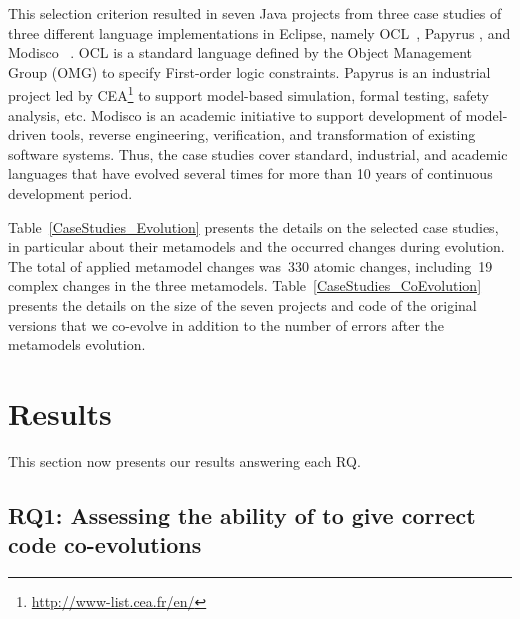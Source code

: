 
This selection criterion resulted in seven Java projects from three case studies of three different language implementations in Eclipse, namely OCL~\cite{MDTOCL}, Papyrus \cite{MDTPapyrus}, and Modisco~\cite{MDTModisco} .
%
OCL is a standard language defined by the Object Management Group (OMG) to specify First-order logic constraints. Papyrus is an industrial project led by CEA\footnote{\url{http://www-list.cea.fr/en/}} to support model-based simulation, formal testing, safety analysis, etc. Modisco is an academic initiative to support development of model-driven tools, reverse engineering, verification, and transformation of existing software systems. 
Thus, the case studies cover standard, industrial, and academic languages that have evolved several times for more than 10 years of continuous development period.

Table~\ref{CaseStudies_Evolution} presents the details on the selected case studies, in particular about their metamodels and the occurred changes during evolution. The total of applied metamodel changes was~330 atomic changes, including~19 complex changes in the three metamodels. 
%
Table~\ref{CaseStudies_CoEvolution} presents the details on the size of the seven projects and code of the original versions that we co-evolve in addition to the number of errors after the metamodels evolution. 

\section{Results}
\label{ch3__results}
This section now presents our results answering each RQ. 

\subsection{RQ1: Assessing the ability of \LLM to give correct code co-evolutions }


